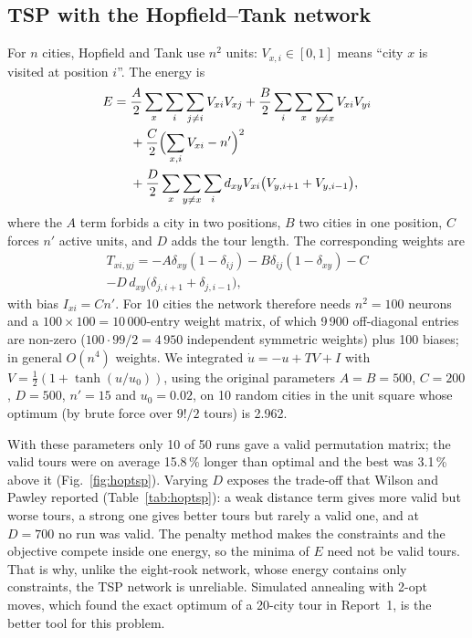 \documentclass[journal]{IEEEtran}
\begin{document}
\subsection{TSP with the Hopfield--Tank network}
For $n$ cities, Hopfield and Tank \cite{hopfieldtank1985} use $n^2$ units: $V_{x,i}\in[0,1]$
means ``city $x$ is visited at position $i$''. The energy is
\begin{equation}
\begin{split}
E = {}&\frac A2\sum_x\sum_i\sum_{j\ne i}V_{xi}V_{xj} + \frac B2\sum_i\sum_x\sum_{y\ne x}V_{xi}V_{yi}\\
  &+ \frac C2\Bigl(\sum_{x,i}V_{xi} - n'\Bigr)^2 \\
  &+ \frac D2\sum_x\sum_{y\ne x}\sum_i d_{xy}V_{xi}\bigl(V_{y,i+1}+V_{y,i-1}\bigr),
\end{split}
\end{equation}
where the $A$ term forbids a city in two positions, $B$ two cities in one position, $C$ forces
$n'$ active units, and $D$ adds the tour length. The corresponding weights are
\begin{multline}
T_{xi,yj} = -A\delta_{xy}(1-\delta_{ij}) - B\delta_{ij}(1-\delta_{xy}) - C \\
- D\,d_{xy}\bigl(\delta_{j,i+1}+\delta_{j,i-1}\bigr),
\end{multline}
with bias $I_{xi}=Cn'$. For 10 cities the network therefore needs $n^2=100$ neurons and a
$100\times100=10\,000$-entry weight matrix, of which 9\,900 off-diagonal entries are non-zero
($100\cdot99/2=4\,950$ independent symmetric weights) plus 100 biases; in general $O(n^4)$ weights.
We integrated $\dot u = -u + T V + I$ with $V=\frac12(1+\tanh(u/u_0))$, using the original
parameters $A=B=500$, $C=200$, $D=500$, $n'=15$ and $u_0=0.02$, on 10 random cities in the unit
square whose optimum (by brute force over $9!/2$ tours) is 2.962.

With these parameters only 10 of 50 runs gave a valid permutation matrix; the valid tours were
on average 15.8\,\% longer than optimal and the best was 3.1\,\% above it
(Fig.~\ref{fig:hoptsp}). Varying $D$ exposes the trade-off that Wilson and Pawley reported
\cite{wilson1988} (Table~\ref{tab:hoptsp}): a weak distance term gives more valid but worse
tours, a strong one gives better tours but rarely a valid one, and at $D=700$ no run was valid.
The penalty method makes the constraints and the objective compete inside one energy, so
the minima of $E$ need not be valid tours. That is why, unlike the eight-rook network, whose
energy contains only constraints, the TSP network is unreliable. Simulated annealing with 2-opt moves, which found the exact optimum
of a 20-city tour in Report~1, is the better tool for this problem.
\end{document}

